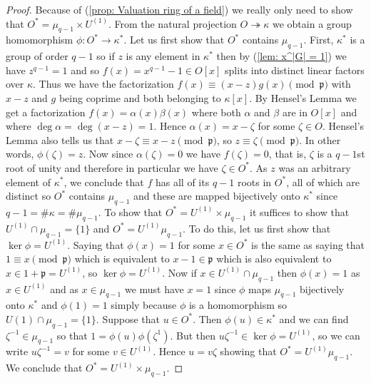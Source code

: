 \documentclass{article}
\newcommand{\mfrak}[1]{\mathfrak{#1}}
\begin{document}
\begin{proof}
    Because of (\ref{prop: Valuation ring of a field}) we really only need to show that $O^* = \mu_{q-1} \times U^{(1)}$. From the natural projection $O \twoheadrightarrow \kappa$ we obtain a group homomorphism $\phi : O^* \to \kappa^*$. Let us first show that $O^*$ contains $\mu_{q-1}$. First, $\kappa^*$ is a group of order $q-1$ so if $z$ is any element in $\kappa^*$ then by (\ref{lem: x^|G| = 1}) we have $z^{q-1} = 1$ and so $f(x) = x^{q-1} - 1 \in O[x]$ splits into distinct linear factors over $\kappa$. Thus we have the factorization $f(x) \equiv (x-z) g(x) \pmod {\mfrak p}$ with $x - z$ and $g$ being coprime and both belonging to $\kappa[x]$. By Hensel's Lemma we get a factorization $f(x) = \alpha(x)\beta(x)$ where both $\alpha$ and $\beta$ are in $O[x]$ and where $\deg \alpha = \deg (x - z) = 1$. Hence $\alpha(x) = x - \zeta$ for some $\zeta \in O$. Hensel's Lemma also tells us that $x - \zeta \equiv x - z \pmod {\mfrak p}$, so $z \equiv \zeta \pmod{\mfrak p}$. In other words, $\phi(\zeta) = z$. Now since $\alpha(\zeta) = 0$ we have $f(\zeta) = 0$, that is, $\zeta$ is a $q-1$st root of unity and therefore in particular we have $\zeta \in O^*$. As $z$ was an arbitrary element of $\kappa^*$, we conclude that $f$ has all of its $q-1$ roots in $O^*$, all of which are distinct so $O^*$ contains $\mu_{q-1}$ and these are mapped bijectively onto $\kappa^*$ since $q- 1 = \# \kappa = \# \mu_{q-1}$. To show that $O^* = U^{(1)} \times \mu_{q-1}$ it suffices to show that $U^{(1)}\cap \mu_{q-1} = \{1\}$ and  $O^* = U^{(1)}\mu_{q-1}$. To do this, let us first show that $\ker \phi = U^{(1)}$. Saying that $\phi(x) = 1$ for some $x \in O^*$ is the same as saying that $1 \equiv x \pmod{\mfrak p}$ which is equivalent to $x - 1 \in \mfrak p$ which is also equivalent to $x \in 1 + \mfrak p = U^{(1)}$, so $\ker \phi = U^{(1)}$. Now if $x \in U^{(1)} \cap \mu_{q-1}$ then $\phi(x) = 1$ as $x \in U^{(1)}$ and as $x \in \mu_{q-1}$ we must have $x = 1$ since $\phi$ maps $\mu_{q-1}$ bijectively onto $\kappa^*$ and $\phi(1) = 1$ simply because $\phi$ is a homomorphism so $U{(1)} \cap \mu_{q-1} = \{ 1 \}$. Suppose that $u \in O^*$. Then $\phi(u) \in \kappa^*$ and we can find $\zeta^{-1} \in \mu_{q-1}$ so that $1 = \phi(u)\phi(\zeta^{1})$. But then $u\zeta^{-1} \in \ker \phi = U^{(1)}$, so we can write $u\zeta^{-1} = v$ for some $v \in U^{(1)}$. Hence $u = v \zeta$ showing that $O^* = U^{(1)}\mu_{q-1}$. We conclude that $O^* = U^{(1)} \times \mu_{q-1}$.
\end{proof}
\end{document}
